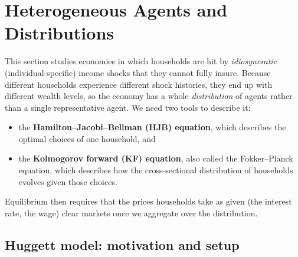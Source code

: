 \section{Heterogeneous Agents and Distributions}

This section studies economies in which households are hit by \emph{idiosyncratic} (individual-specific) income shocks that they cannot fully insure. Because different households experience different shock histories, they end up with different wealth levels, so the economy has a whole \emph{distribution} of agents rather than a single representative agent. We need two tools to describe it:
\begin{itemize}
  \item the \textbf{Hamilton--Jacobi--Bellman (HJB) equation}, which describes the optimal choices of one household, and
  \item the \textbf{Kolmogorov forward (KF) equation}, also called the Fokker--Planck equation, which describes how the cross-sectional distribution of households evolves given those choices.
\end{itemize}
Equilibrium then requires that the prices households take as given (the interest rate, the wage) clear markets once we aggregate over the distribution.

\subsection{Huggett model: motivation and setup }

